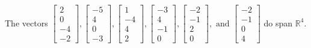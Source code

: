 \begin{exercise}
\begin{exerciseStatement}
  \end{exerciseStatement}
  \begin{exerciseAnswer}
   The vectors \(\left[\begin{array}{r}
2 \\
0 \\
-4 \\
-2
\end{array}\right] , \left[\begin{array}{r}
-5 \\
4 \\
0 \\
-3
\end{array}\right] , \left[\begin{array}{r}
1 \\
-4 \\
4 \\
2
\end{array}\right] , \left[\begin{array}{r}
-3 \\
4 \\
-1 \\
0
\end{array}\right] , \left[\begin{array}{r}
-2 \\
-1 \\
2 \\
0
\end{array}\right] , \text{ and } \left[\begin{array}{r}
-2 \\
-1 \\
0 \\
4
\end{array}\right]\) 
  	 do  
	span \(\mathbb{R}^4\).
  


  \end{exerciseAnswer}
\end{exercise}